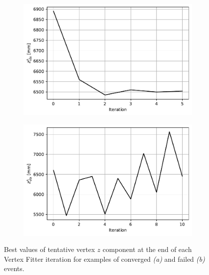 \begin{figure}[t]
	\centering
	\begin{subfigure}{.45\textwidth}
		\includegraphics[width=\textwidth]{graphics/03-vertex_reconstruction/evt0_vertex_z.pdf}
		\caption{}
		\label{fig:z_iter_conv}
	\end{subfigure}
	\begin{subfigure}{.45\textwidth}
		\includegraphics[width=\textwidth]{graphics/03-vertex_reconstruction/evt83_vertex_z.pdf}
		\caption{}
		\label{fig:z_iter_failed}
	\end{subfigure}
	\caption{Best values of tentative \lambdadecay vertex $z$ component at the end of each Vertex Fitter iteration for examples of converged \textit{(a)} and failed \textit{(b)} events.}
	\label{fig:z_iter_conv_vs_failed}
\end{figure}

